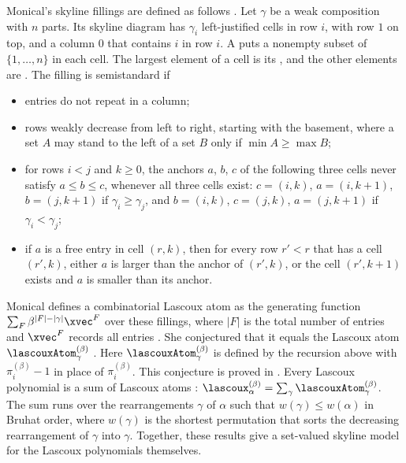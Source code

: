 Monical's skyline fillings are defined as follows \cite[Sec.~1.2]{Monical2017}.
Let $\gamma$ be a weak composition with $n$ parts.  Its skyline diagram has
$\gamma_i$ left-justified cells in row $i$, with row $1$ on top, and a
 column $0$ that contains $i$ in row $i$.  A
 puts a nonempty subset of $\{1,\dotsc,n\}$ in each
cell.  The largest element of a cell is its , and the other
elements are .  The filling is semistandard if
\begin{itemize}
\item entries do not repeat in a column;
\item rows weakly decrease from left to right, starting with the basement,
where a set $A$ may stand to the left of a set $B$ only if
$\min A \geq \max B$;
\item for rows $i \lt j$ and $k \geq 0$, the anchors $a$, $b$, $c$ of the
following three cells never satisfy $a \leq b \leq c$, whenever all three cells
exist: $c=(i,k)$, $a=(i,k+1)$, $b=(j,k+1)$ if $\gamma_i \geq \gamma_j$, and
$b=(i,k)$, $c=(j,k)$, $a=(j,k+1)$ if $\gamma_i \lt \gamma_j$;
\item if $a$ is a free entry in cell $(r,k)$, then for every row $r' \lt r$
that has a cell $(r',k)$, either $a$ is larger than the anchor of $(r',k)$, or
the cell $(r',k+1)$ exists and $a$ is smaller than its anchor.
\end{itemize}
Monical defines a combinatorial Lascoux atom as the generating function
$\sum_F \beta^{|F|-|\gamma|}\xvec^F$ over these fillings, where $|F|$ is the
total number of entries and $\xvec^F$ records all entries
\cite[Def.~1.1]{Monical2017}.  She conjectured that it equals the Lascoux atom
$\lascouxAtom^{(\beta)}_\gamma$ \cite[Conj.~5.2]{Monical2017}.  Here
$\lascouxAtom^{(\beta)}_\gamma$ is defined by the recursion above with
$\pi_i^{(\beta)} - 1$ in place of $\pi_i^{(\beta)}$.  This conjecture is
proved in \cite[Thm.~4.4]{BuciumasScrimshawWeber2020}.  Every Lascoux
polynomial is a sum of Lascoux atoms \cite[Thm.~5.1]{Monical2017}:
$\lascoux^{(\beta)}_\alpha = \sum_\gamma \lascouxAtom^{(\beta)}_\gamma$.
The sum runs over the rearrangements $\gamma$ of $\alpha$ such that
$w(\gamma) \leq w(\alpha)$ in Bruhat order, where $w(\gamma)$ is the shortest
permutation that sorts the decreasing rearrangement of $\gamma$ into $\gamma$.
Together, these results give a set-valued skyline model for the Lascoux
polynomials themselves.

